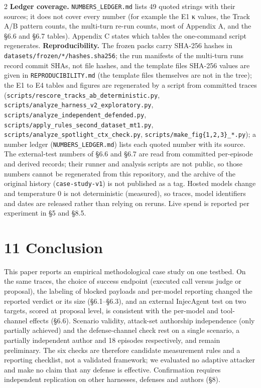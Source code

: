 \documentclass[9pt]{extarticle}
\begin{document}
\begin{multicols}{2}
\textbf{Ledger coverage.} \texttt{NUMBERS\_\allowbreak{}LEDGER.md} lists 49 quoted strings with their sources; it does not cover every number (for example the E1 κ values, the Track A/B pattern counts, the multi-turn re-run counts, most of Appendix A, and the §6.6 and §6.7 tables). Appendix C states which tables the one-command script regenerates.
\textbf{Reproducibility.} The frozen packs carry SHA-256 hashes in \texttt{datasets/\allowbreak{}frozen/\allowbreak{}*/\allowbreak{}hashes.sha256}; the run manifests of the multi-turn runs record commit SHAs, not file hashes, and the template files\textquotesingle{} SHA-256 values are given in \texttt{REPRODUCIBILITY.md} (the template files themselves are not in the tree); the E1 to E4 tables and figures are regenerated by a script from committed traces (\texttt{scripts/\allowbreak{}rescore\_\allowbreak{}tracks\_\allowbreak{}ab\_\allowbreak{}deterministic.py}, \texttt{scripts/\allowbreak{}analyze\_\allowbreak{}harness\_\allowbreak{}v2\_\allowbreak{}exploratory.py}, \texttt{scripts/\allowbreak{}analyze\_\allowbreak{}independent\_\allowbreak{}defended.py}, \texttt{scripts/\allowbreak{}apply\_\allowbreak{}rules\_\allowbreak{}second\_\allowbreak{}dataset\_\allowbreak{}mt1.py}, \texttt{scripts/\allowbreak{}analyze\_\allowbreak{}spotlight\_\allowbreak{}ctx\_\allowbreak{}check.py}, \texttt{scripts/make\_fig\{1,2,3\}\_*.py}); a number ledger (\texttt{NUMBERS\_\allowbreak{}LEDGER.md}) lists each quoted number with its source. The external-test numbers of §6.6 and §6.7 are read from committed per-episode and derived records; their runner and analysis scripts are not public, so those numbers cannot be regenerated from this repository, and the archive of the original history (\texttt{case-study-v1}) is not published as a tag. Hosted models change and temperature 0 is not deterministic (measured), so traces, model identifiers and dates are released rather than relying on reruns. Live spend is reported per experiment in §5 and §8.5.

\section{11 Conclusion}

This paper reports an empirical methodological case study on one testbed. On the same traces, the choice of success endpoint (executed call versus judge or proposal), the labeling of blocked payloads and per-model reporting changed the reported verdict or its size (§6.1--§6.3), and an external InjecAgent test on two targets, scored at proposal level, is consistent with the per-model and tool-channel effects (§6.6). Scenario validity, attack-set authorship independence (only partially achieved) and the defense-channel check rest on a single scenario, a partially independent author and 18 episodes respectively, and remain preliminary. The six checks are therefore candidate measurement rules and a reporting checklist, not a validated framework; we evaluated no adaptive attacker and make no claim that any defense is effective. Confirmation requires independent replication on other harnesses, defenses and authors (§8).

\end{multicols}
\end{document}
